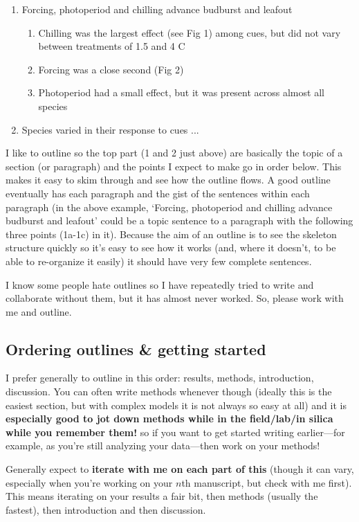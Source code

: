 \documentclass[11pt,letter]{article}
\begin{document}
\begin{enumerate}
\item Forcing, photoperiod and chilling advance budburst and leafout
\begin{enumerate}
\item Chilling was the largest effect (see Fig 1) among cues, but did not vary between treatments of 1.5 and 4 C
\item Forcing was a close second (Fig 2)
\item Photoperiod had a small effect, but it was present across almost all species
\end{enumerate}
\item Species varied in their response to cues ... 
\end{enumerate}

I like to outline so the top part (1 and 2 just above) are basically the topic of a section (or paragraph) and the points I expect to make go in order below. This makes it easy to skim through and see how the outline flows. A good outline eventually has each paragraph and the gist of the sentences within each paragraph (in the above example, `Forcing, photoperiod and chilling advance budburst and leafout' could be a topic sentence to a paragraph with the following three points (1a-1c) in it). Because the aim of an outline is to see the skeleton structure quickly so it's easy to see how it works (and, where it doesn't, to be able to re-organize it easily) it should have very few complete sentences. 

I know some people hate outlines so I have repeatedly tried to write and collaborate without them, but it has almost never worked. So, please work with me and outline. 

\subsection{Ordering outlines \& getting started}
I prefer generally to outline in this order: results, methods, introduction, discussion. You can often write methods whenever though (ideally this is the easiest section, but with complex models it is not always so easy at all) and it is {\bf especially good to jot down methods while in the field/lab/in silica while you remember them!} so if you want to get started writing earlier---for example, as you're still analyzing your data---then work on your methods! 

Generally expect to {\bf iterate with me on each part of this} (though it can vary, especially when you're working on your $n$th manuscript, but check with me first). This means iterating on your results a fair bit, then methods (usually the fastest), then introduction and then discussion. 
\end{document}
